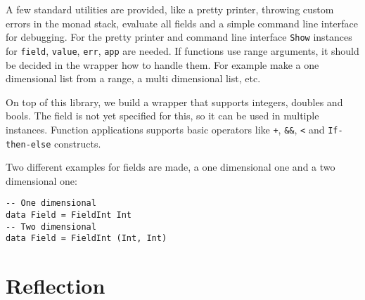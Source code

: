 \documentclass{article}
\begin{document}
	A few standard utilities are provided, like a pretty printer, throwing custom errors in the monad stack, evaluate all fields and a simple command line interface for debugging. For the pretty printer and command line interface \texttt{Show} instances for \texttt{field}, \texttt{value}, \texttt{err}, \texttt{app} are needed. If functions use range arguments, it should be decided in the wrapper how to handle them. For example make a one dimensional list from a range, a multi dimensional list, etc.
	
	On top of this library, we build a wrapper that supports integers, doubles and bools. The field is not yet specified for this, so it can be used in multiple instances. Function applications supports basic operators like \texttt{+}, \texttt{\&\&}, \texttt{<} and \texttt{If-then-else} constructs.
	
	Two different examples for fields are made, a one dimensional one and a two dimensional one:
\begin{verbatim}
-- One dimensional
data Field = FieldInt Int
-- Two dimensional
data Field = FieldInt (Int, Int)
\end{verbatim}
	
	
	\section{Reflection}
	
\end{document}
